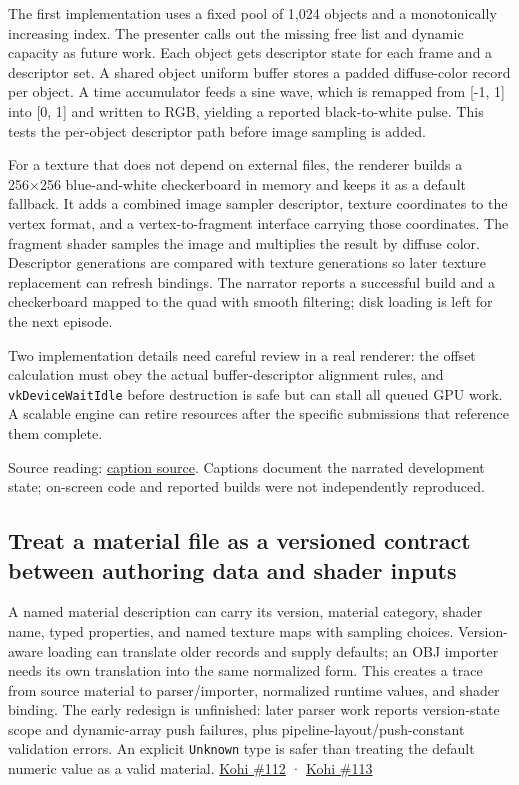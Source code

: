 The first implementation uses a fixed pool of 1,024 objects and a monotonically increasing index. The presenter calls out the missing free list and dynamic capacity as future work. Each object gets descriptor state for each frame and a descriptor set. A shared object uniform buffer stores a padded diffuse-color record per object. A time accumulator feeds a sine wave, which is remapped from {[}-1, 1{]} into {[}0, 1{]} and written to RGB, yielding a reported black-to-white pulse. This tests the per-object descriptor path before image sampling is added.

For a texture that does not depend on external files, the renderer builds a 256×256 blue-and-white checkerboard in memory and keeps it as a default fallback. It adds a combined image sampler descriptor, texture coordinates to the vertex format, and a vertex-to-fragment interface carrying those coordinates. The fragment shader samples the image and multiplies the result by diffuse color. Descriptor generations are compared with texture generations so later texture replacement can refresh bindings. The narrator reports a successful build and a checkerboard mapped to the quad with smooth filtering; disk loading is left for the next episode.

Two implementation details need careful review in a real renderer: the offset calculation must obey the actual buffer-descriptor alignment rules, and \texttt{vkDeviceWaitIdle} before destruction is safe but can stall all queued GPU work. A scalable engine can retire resources after the specific submissions that reference them complete.

Source reading: \href{https://www.youtube.com/watch?v=n7qS96720yI}{caption source}. Captions document the narrated development state; on-screen code and reported builds were not independently reproduced.

\subsection{Treat a material file as a versioned contract between authoring data and shader inputs}\label{06-engine-ii-ch025-treat-a-material-file-as-a-versioned-contract-between-authoring-data-and-shader-inputs}

A named material description can carry its version, material category, shader name, typed properties, and named texture maps with sampling choices. Version-aware loading can translate older records and supply defaults; an OBJ importer needs its own translation into the same normalized form. This creates a trace from source material to parser/importer, normalized runtime values, and shader binding. The early redesign is unfinished: later parser work reports version-state scope and dynamic-array push failures, plus pipeline-layout/push-constant validation errors. An explicit \texttt{Unknown} type is safer than treating the default numeric value as a valid material. \href{https://www.youtube.com/watch?v=-Ps-749SEs4}{Kohi \#112} · \href{https://www.youtube.com/watch?v=-lHaaoIrdFM}{Kohi \#113}

